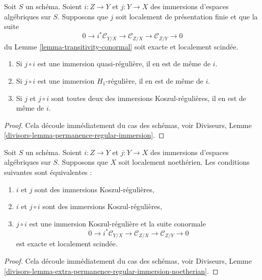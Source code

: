 \begin{lemma}
\label{lemma-permanence-regular-immersion}
Soit $S$ un schéma. Soient $i : Z \to Y$ et $j : Y \to X$ des immersions
d'espaces algébriques sur $S$. Supposons que $j$ soit localement de présentation finie
et que la suite
$$
0 \to i^*\mathcal{C}_{Y/X} \to
\mathcal{C}_{Z/X} \to
\mathcal{C}_{Z/Y} \to 0
$$
du Lemme \ref{lemma-transitivity-conormal} soit exacte et localement scindée.
\begin{enumerate}
\item Si $j \circ i$ est une immersion quasi-régulière, il en est de même de $i$.
\item Si $j \circ i$ est une immersion $H_1$-régulière, il en est de même de $i$.
\item Si $j$ et $j \circ i$ sont toutes deux des immersions Koszul-régulières, il en est de même de $i$.
\end{enumerate}
\end{lemma}

\begin{proof}
Cela découle immédiatement du cas des schémas, voir
Diviseurs, Lemme \ref{divisors-lemma-permanence-regular-immersion}.
\end{proof}

\begin{lemma}
\label{lemma-extra-permanence-regular-immersion-noetherian}
Soit $S$ un schéma. Soient $i : Z \to Y$ et $j : Y \to X$ des immersions
d'espaces algébriques sur $S$. Supposons que $X$ soit localement noethérien.
Les conditions suivantes sont équivalentes :
\begin{enumerate}
\item $i$ et $j$ sont des immersions Koszul-régulières,
\item $i$ et $j \circ i$ sont des immersions Koszul-régulières,
\item $j \circ i$ est une immersion Koszul-régulière et la suite conormale
$$
0 \to i^*\mathcal{C}_{Y/X} \to
\mathcal{C}_{Z/X} \to
\mathcal{C}_{Z/Y} \to 0
$$
est exacte et localement scindée.
\end{enumerate}
\end{lemma}

\begin{proof}
Cela découle immédiatement du cas des schémas, voir Diviseurs, Lemme
\ref{divisors-lemma-extra-permanence-regular-immersion-noetherian}.
\end{proof}














